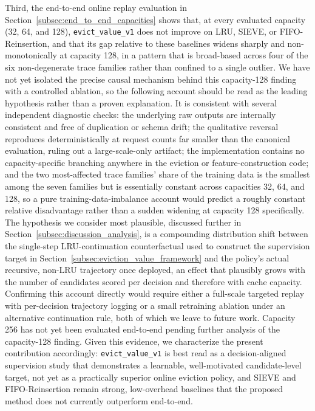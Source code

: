 \documentclass[preprint,12pt]{elsarticle}
\begin{document}
Third, the end-to-end online replay evaluation in Section~\ref{subsec:end_to_end_capacities} shows that, at every evaluated capacity (32, 64, and 128), \texttt{evict\_value\_v1} does not improve on LRU, SIEVE, or FIFO-Reinsertion, and that its gap relative to these baselines widens sharply and non-monotonically at capacity 128, in a pattern that is broad-based across four of the six non-degenerate trace families rather than confined to a single outlier. We have not yet isolated the precise causal mechanism behind this capacity-128 finding with a controlled ablation, so the following account should be read as the leading hypothesis rather than a proven explanation. It is consistent with several independent diagnostic checks: the underlying raw outputs are internally consistent and free of duplication or schema drift; the qualitative reversal reproduces deterministically at request counts far smaller than the canonical evaluation, ruling out a large-scale-only artifact; the implementation contains no capacity-specific branching anywhere in the eviction or feature-construction code; and the two most-affected trace families' share of the training data is the smallest among the seven families but is essentially constant across capacities 32, 64, and 128, so a pure training-data-imbalance account would predict a roughly constant relative disadvantage rather than a sudden widening at capacity 128 specifically. The hypothesis we consider most plausible, discussed further in Section~\ref{subsec:discussion_analysis}, is a compounding distribution shift between the single-step LRU-continuation counterfactual used to construct the supervision target in Section~\ref{subsec:eviction_value_framework} and the policy's actual recursive, non-LRU trajectory once deployed, an effect that plausibly grows with the number of candidates scored per decision and therefore with cache capacity. Confirming this account directly would require either a full-scale targeted replay with per-decision trajectory logging or a small retraining ablation under an alternative continuation rule, both of which we leave to future work. Capacity 256 has not yet been evaluated end-to-end pending further analysis of the capacity-128 finding. Given this evidence, we characterize the present contribution accordingly: \texttt{evict\_value\_v1} is best read as a decision-aligned supervision study that demonstrates a learnable, well-motivated candidate-level target, not yet as a practically superior online eviction policy, and SIEVE and FIFO-Reinsertion remain strong, low-overhead baselines that the proposed method does not currently outperform end-to-end.
\end{document}
